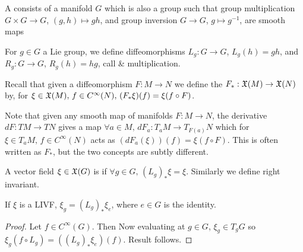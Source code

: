 \documentclass{article}
\begin{document}
\begin{definition}
A  consists of a manifold $G$ which is also a group such that group multiplication $G \times G \to G$, $(g,h)\mapsto gh$, and group inversion $G \to G$, $g \mapsto g^{-1}$, are smooth maps
\end{definition}

For $g \in G$ a Lie group, we define diffeomorphisms $L_g : G \to G$, $L_g(h) = gh$, and $R_g : G \to G$, $R_g(h) = hg$, call  \&  multiplication. 

\begin{definition}
Recall that given a diffeomorphism $F:M \to N$ we define the  $F_\ast : \mathfrak{X}(M) \to \mathfrak{X}(N)$ by, for $\xi \in \mathfrak{X}(M), \, f \in C^\infty(N), \, (F_\ast \xi)(f) = \xi(f \circ F)$.
\end{definition}

\begin{remark}
Note that given any smooth map of manifolds $F:M \to N$, the derivative $dF:TM \to TN$ gives a map $\forall a \in M, \, dF_a : T_a M \to T_{F(a)}N$ which for $\xi \in T_a M, \, f \in C^\infty(N)$ acts as $(dF_a(\xi))(f) = \xi(f \circ F)$. This is often written as $F_\ast$, but the two concepts are subtly different.
\end{remark}

\begin{definition}
A vector field $\xi\in \mathfrak{X}(G)$ is  if $\forall g \in G, \, (L_g)_\ast \xi = \xi$. Similarly we define right invariant.
\end{definition}

\begin{lemma}
If $\xi$ is a LIVF, $\xi_g = (L_g)_\ast \xi_e$, where $e\in G$ is the identity.
\end{lemma}
\begin{proof}
Let $f \in C^\infty(G)$. Then
Now evaluating at $g \in G$, $\xi_g \in T_gG$ so $\xi_g(f \circ L_g)= ((L_g)_\ast \xi_e)(f)$. Result follows. 
\end{proof}
\end{document}
